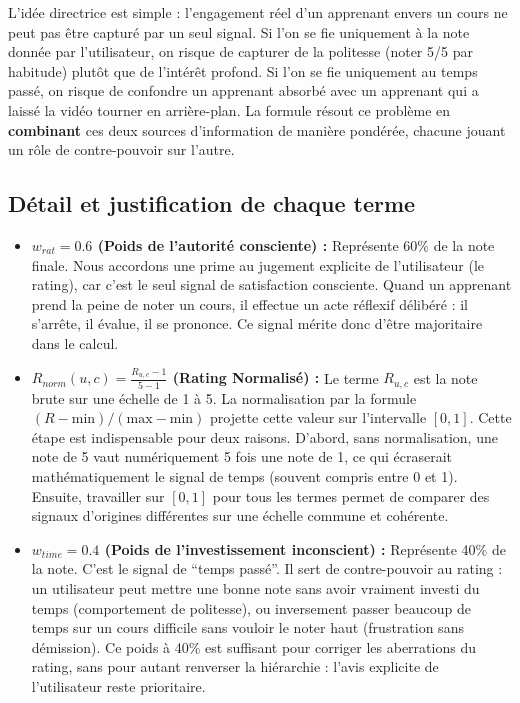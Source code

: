 \documentclass[11pt,a4paper]{article}
\begin{document}
L'idée directrice est simple : l'engagement réel d'un apprenant envers un cours ne peut pas être capturé par un seul signal. Si l'on se fie uniquement à la note donnée par l'utilisateur, on risque de capturer de la politesse (noter 5/5 par habitude) plutôt que de l'intérêt profond. Si l'on se fie uniquement au temps passé, on risque de confondre un apprenant absorbé avec un apprenant qui a laissé la vidéo tourner en arrière-plan. La formule résout ce problème en \textbf{combinant} ces deux sources d'information de manière pondérée, chacune jouant un rôle de contre-pouvoir sur l'autre.

\subsection{Détail et justification de chaque terme}
\begin{itemize}
    \item \textbf{$w_{rat} = 0.6$ (Poids de l'autorité consciente) :}
    Représente 60\% de la note finale. Nous accordons une prime au jugement explicite de l'utilisateur (le rating), car c'est le seul signal de satisfaction consciente. Quand un apprenant prend la peine de noter un cours, il effectue un acte réflexif délibéré : il s'arrête, il évalue, il se prononce. Ce signal mérite donc d'être majoritaire dans le calcul.

    \item \textbf{$R_{norm}(u,c) = \frac{R_{u,c} - 1}{5 - 1}$ (Rating Normalisé) :}
    Le terme $R_{u,c}$ est la note brute sur une échelle de 1 à 5. La normalisation par la formule $(R - \text{min}) / (\text{max} - \text{min})$ projette cette valeur sur l'intervalle $[0, 1]$. Cette étape est indispensable pour deux raisons. D'abord, sans normalisation, une note de 5 vaut numériquement 5 fois une note de 1, ce qui écraserait mathématiquement le signal de temps (souvent compris entre 0 et 1). Ensuite, travailler sur $[0, 1]$ pour tous les termes permet de comparer des signaux d'origines différentes sur une échelle commune et cohérente.

    \item \textbf{$w_{time} = 0.4$ (Poids de l'investissement inconscient) :}
    Représente 40\% de la note. C'est le signal de ``temps passé''. Il sert de contre-pouvoir au rating : un utilisateur peut mettre une bonne note sans avoir vraiment investi du temps (comportement de politesse), ou inversement passer beaucoup de temps sur un cours difficile sans vouloir le noter haut (frustration sans démission). Ce poids à 40\% est suffisant pour corriger les aberrations du rating, sans pour autant renverser la hiérarchie : l'avis explicite de l'utilisateur reste prioritaire.


\end{itemize}
\end{document}
